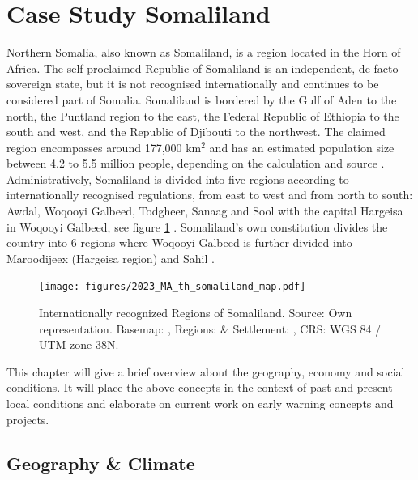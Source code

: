 \section{Case Study Somaliland}\label{sec:case_area} 

Northern Somalia, also known as Somaliland, is a region located in the Horn of Africa. The self-proclaimed Republic of Somaliland is an independent, de facto sovereign state, but it is not recognised internationally and continues to be considered part of Somalia. Somaliland is bordered by the Gulf of Aden to the north, the Puntland region to the east, the Federal Republic of Ethiopia to the south and west, and the Republic of Djibouti to the northwest. The claimed region encompasses around 177,000 km$^2$ and has an estimated population size between 4.2 to 5.5 million people, depending on the calculation and source \autocite{petrucciLandscapeLandformsNorthern2022,republicofsomaliaRepublicSomalilandCountry2021,scrsFeasibilityStudyPotential2022}. Administratively, Somaliland is divided into five regions according to internationally recognised regulations, from east to west and from north to south: Awdal, Woqooyi Galbeed, Todgheer, Sanaag and Sool with the capital Hargeisa in Woqooyi Galbeed, see figure \ref{fig:th_somaliland} \autocite{republicofsomaliaRepublicSomalilandCountry2021}. Somaliland's own constitution divides the country into 6 regions where Woqooyi Galbeed is further divided into Maroodijeex (Hargeisa region) and Sahil \autocite{republicofsomalilandRegionsDistrictsSelfmanagement2019}.

\begin{figure}[!hb]
    \centering
    \texttt{[image: figures/2023\_MA\_th\_somaliland\_map.pdf]}
    \decoRule
    \caption[Regions of Somaliland]{Internationally recognized Regions of Somaliland. Source: Own representation. Basemap: \textcite{esriWorldImageryOverview2023}, Regions: \textcite{swalimAdministrativeDistrictsSomalia2019} \& Settlement: \textcite{swalimSomaliaAssortedSettlements2016}, CRS: WGS 84 / UTM zone 38N.}
    \label{fig:th_somaliland}
\end{figure}

This chapter will give a brief overview about the geography, economy and social conditions. It will place the above concepts in the context of past and present local conditions and elaborate on current work on early warning concepts and projects. 


\subsection{Geography \& Climate}

